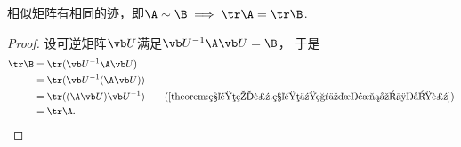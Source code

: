 \begin{property}\label{theorem:特征值与特征向量.矩阵相似的必要条件4}
相似矩阵有相同的迹，即\(\A\sim\B \implies \tr\A=\tr\B\).
\begin{proof}
设可逆矩阵\(\P\)满足\(\P^{-1}\A\P=\B\)，
于是\begin{align*}
	\tr\B
	&= \tr(\P^{-1}\A\P) \\
	&= \tr(\P^{-1}(\A\P)) \\
	&= \tr((\A\P)\P^{-1})
		\tag{\cref{theorem:矩阵的迹.矩阵乘积交换次序不变迹}} \\
	&= \tr\A.
	\qedhere
\end{align*}
\end{proof}



\end{property}
